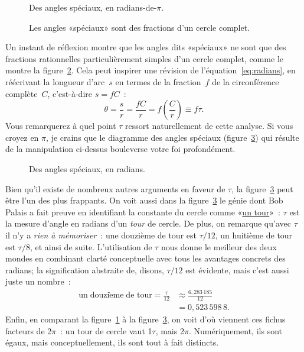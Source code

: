 \begin{figure}
\begin{center}
\end{center}
\caption{Des angles spéciaux, en radians-de-$\pi$.\label{fig:pi_angles}}
\end{figure}

\begin{figure}
\begin{center}
\end{center}
\caption{Les angles «\ns spéciaux\ns » sont des fractions d'un cercle
complet.\label{fig:angle_fractions}}
\end{figure}

Un instant de réflexion montre que les angles dits «\ns spéciaux\ns » ne sont que
des fractions rationnelles particulièrement simples d'un cercle complet, comme
le montre la figure~\ref{fig:angle_fractions}. Cela peut inspirer une révision de
l'équation~\eqref{eq:radians}, en réécrivant la longueur d'arc~$s$ en termes de
la fraction~$f$ de la circonférence complète~$C$, c'est-à-dire $s = f C$~:
\[ \theta = \frac{s}{r} = \frac{fC}{r} =  f\left(\frac{C}{r}\right) \equiv f\tau. \]
Vous remarquerez à quel point $\tau$ ressort naturellement de cette analyse. Si vous croyez en
$\pi$, je crains que le diagramme des angles spéciaux (figure~\ref{fig:tau_angles})
qui résulte de la manipulation ci-dessus bouleverse votre foi profondément.

\begin{figure}
\begin{center}
\end{center}
\caption{Des angles spéciaux, en radians.\label{fig:tau_angles}}
\end{figure}

Bien qu'il existe de nombreux autres arguments en faveur de $\tau$, la
figure~\ref{fig:tau_angles} peut être l'un des plus frappants. On voit
aussi dans la figure~\ref{fig:tau_angles} le génie dont Bob Palais
a fait preuve en identifiant la constante du cercle comme
«\ns \href{https://fr.wikipedia.org/wiki/Tour_(angle)}{un tour}\ns »~: $\tau$ est la
mesure d'angle en radians d'un \emph{tour} de cercle. De plus, on remarque
qu'avec $\tau$ il n'y a \emph{rien à mémoriser}~: une douzième de tour est
$\tau/12$, un huitième de tour est $\tau/8$, et ainsi de suite. L'utilisation de
$\tau$ nous donne le meilleur des deux mondes en combinant clarté conceptuelle
avec tous les avantages concrets des radians\ns; la signification abstraite de,
disons, $\tau/12$ est évidente, mais c'est aussi juste un nombre~:
\[
\begin{split}
\mbox{un}\; \mathrm{douzi\grave{e}me}\; \mbox{de tour} = \frac{\tau}{12} & \approx \frac{6{,}283\,185}{12} \\
                                             & = 0{,}523\,598\,8.
\end{split}
\]
Enfin, en comparant la figure~\ref{fig:pi_angles} à la
figure~\ref{fig:tau_angles}, on voit d'où viennent ces fichus facteurs de
2$\pi$~: un tour de cercle vaut 1$\tau$, mais 2$\pi$. Numériquement, ils sont
égaux, mais conceptuellement, ils sont tout à fait distincts.

